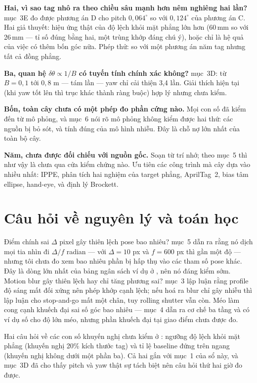 \documentclass[marker.tex]{subfiles}
\begin{document}
\textbf{Hai, vì sao tag nhô ra theo chiều sâu mạnh hơn nêm nghiêng hai lần?}  mục~3E đo được phương án D cho pitch \(0{,}064^\circ\) so với \(0{,}124^\circ\) của phương án C. Hai giả thuyết: hiệu ứng thật của độ lệch khỏi mặt phẳng lớn hơn (60\,mm so với 26\,mm --- tỉ số đúng bằng hai, một trùng khớp đáng chú ý), hoặc chỉ là hệ quả của việc có thêm bốn góc nữa. Phép thử: so với một phương án năm tag nhưng tất cả đồng phẳng.

\textbf{Ba, quan hệ \(\delta\theta \propto 1/B\) có tuyến tính chính xác không?}  mục~3D: từ \(B = 0{,}1\) tới \(0{,}8\) m --- tám lần --- yaw chỉ cải thiện 3,4 lần. Giải thích hiện tại (khi yaw tốt lên thì trục khác thành ràng buộc) hợp lý nhưng chưa kiểm.

\textbf{Bốn, toàn cây chưa có một phép đo phần cứng nào.} Mọi con số đã kiểm đến từ mô phỏng, và  mục~6 nói rõ mô phỏng không kiểm được hai thứ: các nguồn bị bỏ sót, và tính đúng của mô hình nhiễu. Đây là chỗ nợ lớn nhất của toàn bộ cây.

\textbf{Năm,  chưa được đối chiếu với nguồn gốc.} Soạn từ trí nhớ; theo  mục~5 thì như vậy là chưa qua cửa kiểm chứng nào. Ưu tiên các công trình mà cây dựa vào nhiều nhất: IPPE, phân tích hai nghiệm của target phẳng, AprilTag~2, bias tâm ellipse, hand-eye, và định lý Brockett.

\section*{Câu hỏi về nguyên lý và toán học}

Điểm chính sai \(\Delta\) pixel gây thiên lệch pose bao nhiêu?  mục~5 dẫn ra rằng nó dịch mọi tia nhìn đi \(\Delta/f\) radian --- với \(\Delta = 10\) px và \(f = 600\) px thì gần một độ --- nhưng tôi chưa đo xem bao nhiêu phần bị hấp thụ vào các tham số pose khác. Đây là dòng lớn nhất của bảng ngân sách ví dụ ở , nên nó đáng kiểm sớm. Motion blur gây thiên lệch hay chỉ tăng phương sai?  mục~3 lập luận rằng profile độ sáng mất đối xứng nên phép khớp cạnh lệch; nếu hoá ra blur chỉ gây nhiễu thì lập luận cho stop-and-go mất một chân, tuy rolling shutter vẫn còn. Méo làm cong cạnh khuếch đại sai số góc bao nhiêu ---  mục~4 dẫn ra cơ chế ba tầng và có ví dụ số cho độ lớn méo, nhưng phần khuếch đại tại giao điểm chưa được đo.

Hai câu hỏi về các con số khuyến nghị chưa kiểm ở : ngưỡng độ lệch khỏi mặt phẳng (khuyến nghị 20\% kích thước tag) và tỉ lệ baseline đứng trên ngang (khuyến nghị không dưới một phần ba). Cả hai gắn với mục~1 của sổ này, và  mục~3D đã cho thấy pitch và yaw thật sự tách biệt nên câu hỏi thứ hai giờ đo được.
\end{document}
